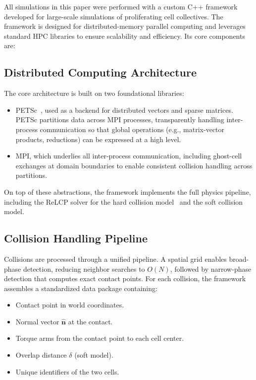 \documentclass[conference]{IEEEtran}
\begin{document}
All simulations in this paper were performed with a custom C++ framework developed for large-scale simulations of proliferating cell collectives. The framework is designed for distributed-memory parallel computing and leverages standard HPC libraries to ensure scalability and efficiency. Its core components are:

\subsection{Distributed Computing Architecture}

The core architecture is built on two foundational libraries:
\begin{itemize}
    \item PETSc~\cite{petsc-web-page}, used as a backend for distributed vectors and sparse matrices. PETSc partitions data across MPI processes, transparently handling inter-process communication so that global operations (e.g., matrix-vector products, reductions) can be expressed at a high level.
    \item MPI, which underlies all inter-process communication, including ghost-cell exchanges at domain boundaries to enable consistent collision handling across partitions.
\end{itemize}

On top of these abstractions, the framework implements the full physics pipeline, including the ReLCP solver for the hard collision model~\cite{Weady2024} and the soft collision model.


\subsection{Collision Handling Pipeline}

Collisions are processed through a unified pipeline. A spatial grid enables broad-phase detection, reducing neighbor searches to $O(N)$, followed by narrow-phase detection that computes exact contact points. For each collision, the framework assembles a standardized data package containing:

\begin{itemize}
    \item Contact point in world coordinates.
    \item Normal vector $\hat{\mathbf{n}}$ at the contact.
    \item Torque arms from the contact point to each cell center.
    \item Overlap distance $\delta$ (soft model).
    \item Unique identifiers of the two cells.
\end{itemize}
\end{document}
